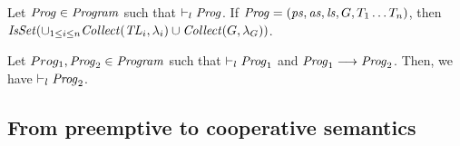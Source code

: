\begin{lemma}
Let $\mathit{Prog} \in \mathit{Program}$ such that $\vdash_l \mathit{Prog}$.
If $\mathit{Prog} = (\mathit{ps}, \mathit{as}, \mathit{ls}, G, T_1 \ldots T_n)$, 
then $\mathit{IsSet}(\cup_{1 \le i \le n} \mathit{Collect}(\mathit{TL}_i, \lambda_i) \cup \mathit{Collect}(G, \lambda_G))$.
\end{lemma}

\begin{lemma}
Let $Prog_1, \mathit{Prog}_2 \in \mathit{Program}$ such that $\vdash_l \mathit{Prog}_1$ and $\mathit{Prog}_1 \longrightarrow \mathit{Prog}_2$.
Then, we have $\vdash_l \mathit{Prog}_2$.
\end{lemma}

\subsection{From preemptive to cooperative semantics}
\label{sec:yield-sufficiency}

